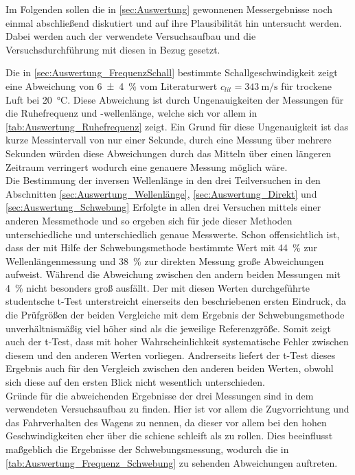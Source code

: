 Im Folgenden sollen die in \cref{sec:Auswertung} gewonnenen Messergebnisse noch einmal 
abschließend diskutiert und auf ihre Plausibilität hin untersucht werden.
Dabei werden auch der verwendete Versuchsaufbau und die Versuchsdurchführung mit diesen
in Bezug gesetzt.

Die in \cref{sec:Auswertung_FrequenzSchall} bestimmte Schallgeschwindigkeit zeigt eine Abweichung
von \SI{6(4)}{\percent} vom Literaturwert $c_{lit} = \SI{343}{\meter\per\second}$ \cite{Mende09} 
für trockene Luft bei \SI{20}{\celsius}. Diese Abweichung ist durch Ungenauigkeiten der 
Messungen für die Ruhefrequenz und -wellenlänge, welche sich vor allem in 
\cref{tab:Auswertung_Ruhefrequenz} zeigt. Ein Grund für diese Ungenauigkeit ist das 
kurze Messintervall von nur einer Sekunde, durch eine Messung über mehrere Sekunden 
würden diese Abweichungen durch das Mitteln über einen längeren Zeitraum verringert
wodurch eine genauere Messung möglich wäre.\\

Die Bestimmung der inversen Wellenlänge in den drei Teilversuchen in den Abschnitten
\ref{sec:Auswertung_Wellenlänge}, \ref{sec:Auswertung_Direkt} und \ref{sec:Auswertung_Schwebung}
Erfolgte in allen  drei Versuchen mittels einer anderen Messmethode und so ergeben sich 
für jede dieser Methoden unterschiedliche und unterschiedlich genaue Messwerte. 
Schon offensichtlich ist, dass der mit Hilfe der Schwebungsmethode bestimmte Wert
mit \SI{44}{\percent} zur Wellenlängenmessung und \SI{38}{\percent} zur direkten Messung
große Abweichungen aufweist. Während die Abweichung zwischen den andern beiden Messungen 
mit \SI{4}{\percent} nicht besonders groß ausfällt.
Der mit diesen Werten durchgeführte studentsche t-Test unterstreicht einerseits den 
beschriebenen ersten Eindruck, da die Prüfgrößen der beiden Vergleiche mit dem 
Ergebnis der Schwebungsmethode unverhältnismäßig viel höher sind als die jeweilige 
Referenzgröße. Somit zeigt auch der t-Test, dass mit hoher Wahrscheinlichkeit systematische
Fehler zwischen diesem und den anderen Werten vorliegen.
Andrerseits liefert der t-Test dieses Ergebnis auch für den Vergleich zwischen den anderen
beiden Werten, obwohl sich diese auf den ersten Blick nicht wesentlich unterschieden.\\
Gründe für die abweichenden Ergebnisse der drei Messungen sind in dem verwendeten 
Versuchsaufbau zu finden. Hier ist vor allem die Zugvorrichtung und das 
Fahrverhalten des Wagens zu nennen, da dieser vor allem bei den hohen Geschwindigkeiten
eher über die schiene schleift als zu rollen. Dies beeinflusst maßgeblich die Ergebnisse
der Schwebungsmessung, wodurch die in \cref{tab:Auswertung_Frequenz_Schwebung} zu sehenden 
Abweichungen auftreten.  
